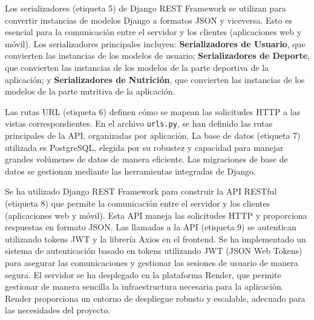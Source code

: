Los serializadores (etiqueta 5) de Django REST Framework se utilizan para convertir instancias de modelos Django a formatos JSON y viceversa. Esto es esencial para la comunicación entre el servidor y los clientes (aplicaciones web y móvil). Los serializadores principales incluyen: \textbf{Serializadores de Usuario}, que convierten las instancias de los modelos de usuario; \textbf{Serializadores de Deporte}, que convierten las instancias de los modelos de la parte deportiva de la aplicación; y \textbf{Serializadores de Nutrición}, que convierten las instancias de los modelos de la parte nutritiva de la aplicación.

Las rutas URL (etiqueta 6) definen cómo se mapean las solicitudes HTTP a las vistas correspondientes. En el archivo \texttt{urls.py}, se han definido las rutas principales de la API, organizadas por aplicación. La base de datos (etiqueta 7) utilizada es PostgreSQL, elegida por su robustez y capacidad para manejar grandes volúmenes de datos de manera eficiente. Las migraciones de base de datos se gestionan mediante las herramientas integradas de Django.

Se ha utilizado Django REST Framework para construir la API RESTful (etiqueta 8) que permite la comunicación entre el servidor y los clientes (aplicaciones web y móvil). Esta API maneja las solicitudes HTTP y proporciona respuestas en formato JSON. Las llamadas a la API (etiqueta 9) se autentican utilizando tokens JWT y la librería Axios en el frontend. Se ha implementado un sistema de autenticación basado en tokens utilizando JWT (JSON Web Tokens) para asegurar las comunicaciones y gestionar las sesiones de usuario de manera segura. El servidor se ha desplegado en la plataforma Render, que permite gestionar de manera sencilla la infraestructura necesaria para la aplicación. Render proporciona un entorno de despliegue robusto y escalable, adecuado para las necesidades del proyecto.